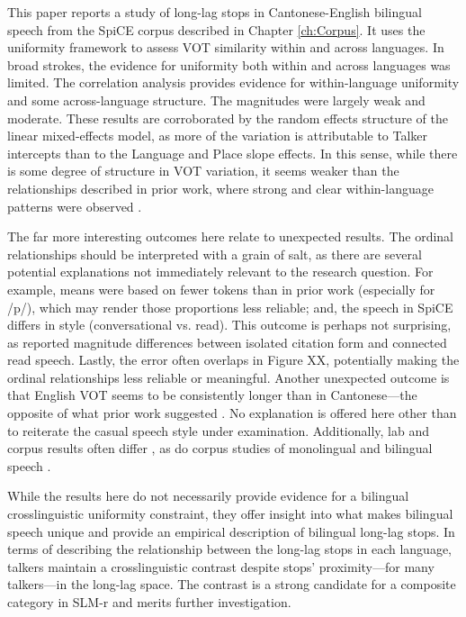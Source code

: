 This paper reports a study of long-lag stops in Cantonese-English bilingual speech from the SpiCE corpus described in Chapter \ref{ch:Corpus}. It uses the uniformity framework to assess VOT similarity within and across languages. In broad strokes, the evidence for uniformity both within and across languages was limited. The correlation analysis provides evidence for within-language uniformity and some across-language structure. The magnitudes were largely weak and moderate. These results are corroborated by the random effects structure of the linear mixed-effects model, as more of the variation is attributable to Talker intercepts than to the Language and Place slope effects. In this sense, while there is some degree of structure in VOT variation, it seems weaker than the relationships described in prior work, where strong and clear within-language patterns were observed \citep{chodroff_2017_structure, chodroff_2019_l2}.

The far more interesting outcomes here relate to unexpected results. The ordinal relationships should be interpreted with a grain of salt, as there are several potential explanations not immediately relevant to the research question. For example, means were based on fewer tokens than in prior work (especially for /p/), which may render those proportions less reliable; and, the speech in SpiCE differs in style (conversational vs. read). This outcome is perhaps not surprising, as \citet{chodroff_2017_structure} reported magnitude differences between isolated citation form and connected read speech. Lastly, the error often overlaps in Figure XX, potentially making the ordinal relationships less reliable or meaningful. Another unexpected outcome is that English VOT seems to be consistently longer than in Cantonese---the opposite of what prior work suggested \citep{clumeck_1981_cantonese, lisker_1964_vot}. No explanation is offered here other than to reiterate the casual speech style under examination. Additionally, lab and corpus results often differ \citep{gahl_2012_reduce,chodroff_2017_structure}, as do corpus studies of monolingual and bilingual speech \cite{johnson_2019_probabilistic}. 

While the results here do not necessarily provide evidence for a bilingual crosslinguistic uniformity constraint, they offer insight into what makes bilingual speech unique and provide an empirical description of bilingual long-lag stops. In terms of describing the relationship between the long-lag stops in each language, talkers maintain a crosslinguistic contrast despite stops' proximity---for many talkers---in the long-lag space. The contrast is a strong candidate for a composite category in SLM-r \citep{flege_2021_slmr} and merits further investigation.

